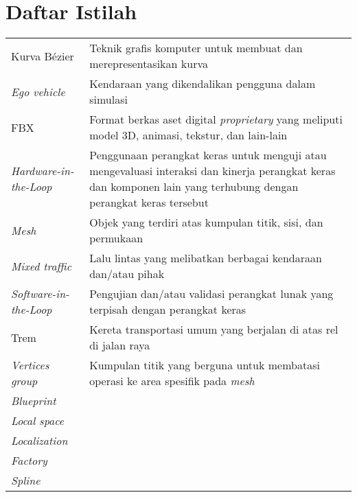 \chapter*{Daftar Istilah}

\begingroup
\def\arraystretch{1.25}
\begin{onehalfspace}
\begin{longtable}{p{} p{}}

	Kurva Bézier & Teknik grafis komputer untuk membuat dan merepresentasikan kurva \\
	\textit{Ego vehicle} & Kendaraan yang dikendalikan pengguna dalam simulasi \\
	FBX & Format berkas aset digital \textit{proprietary} yang meliputi model 3D, animasi, tekstur, dan lain-lain \\
	\textit{Hardware-in-the-Loop} & Penggunaan perangkat keras untuk menguji atau mengevaluasi interaksi dan kinerja perangkat keras dan komponen lain yang terhubung dengan perangkat keras tersebut \\
	\textit{Mesh} & Objek yang terdiri atas kumpulan titik, sisi, dan permukaan \\
	\textit{Mixed traffic} & Lalu lintas yang melibatkan berbagai kendaraan dan/atau pihak \\
	\textit{Software-in-the-Loop} & Pengujian dan/atau validasi perangkat lunak yang terpisah dengan perangkat keras \\
	Trem & Kereta transportasi umum yang berjalan di atas rel di jalan raya \\
	\textit{Vertices group} & Kumpulan titik yang berguna untuk membatasi operasi ke area spesifik pada \textit{mesh} \\

	\textit{Blueprint} &  \\
	\textit{Local space} & \\
	\textit{Localization} & \\
	\textit{Factory} &  \\
	\textit{Spline} &  \\


\end{longtable}
\end{onehalfspace}
\endgroup
\clearpage
